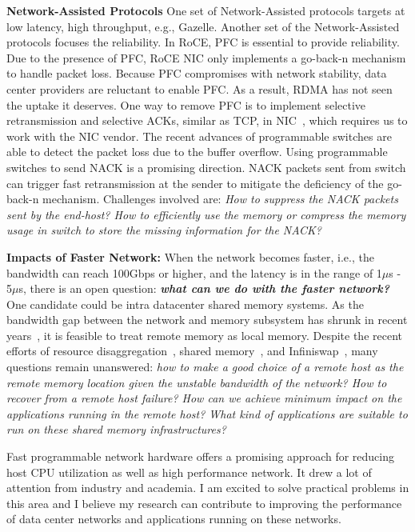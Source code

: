 \documentclass[10pt]{article}
\begin{document}
\textbf{Network-Assisted Protocols}
One set of Network-Assisted protocols targets at low latency, high throughput, e.g., Gazelle.
Another set of the Network-Assisted protocols focuses the reliability.
In RoCE, PFC is essential to provide reliability. 
Due to the presence of PFC, RoCE NIC only implements a go-back-n mechanism to handle packet loss.
Because PFC compromises with network stability, data center providers are reluctant to enable PFC. As a result, RDMA has not seen the uptake it deserves. One way to remove PFC is to implement selective retransmission and selective ACKs, similar as TCP, in NIC~\cite{irn}, which requires us to work with the NIC vendor. The recent advances of programmable switches are able to detect the packet loss due to the buffer overflow. Using programmable switches to send NACK is a promising direction. NACK packets sent from switch can trigger fast 
retransmission at the sender to mitigate the deficiency of the go-back-n mechanism. Challenges involved are: {\it How to suppress the NACK packets sent by the end-host? How to efficiently use the memory or compress the memory usage in switch to store the missing information for the NACK?}  

\textbf{Impacts of Faster Network:}
When the network becomes faster, i.e., the bandwidth can reach 100Gbps or higher, and the latency is in the range of 1$\mu$s - 5$\mu$s, there is an open question: \textbf{\it what can we do with the faster network?} One candidate could be intra datacenter shared memory systems. As the bandwidth gap between the network and memory subsystem has shrunk in recent years~\cite{memory:Marcos}, it is feasible to treat remote memory as local memory. Despite the recent efforts of resource disaggregation~\cite{aggregation:gao}, shared memory~\cite{memory:Marcos}, and Infiniswap~\cite{Infiniswap}, many questions remain unanswered: {\it how to make a good choice of a remote host as the remote memory location given the unstable bandwidth of the network? How to recover from a remote host failure? How can we achieve minimum impact on the applications running in the remote host? What kind of applications are suitable to run on these shared memory infrastructures?}

Fast programmable network hardware offers a promising approach for reducing host CPU utilization as well as high performance network. It drew a lot of attention from industry and academia. I am excited to solve practical problems in this area and I believe my research can contribute to improving the performance of data center networks and applications running on these networks. 

%

\end{document}
